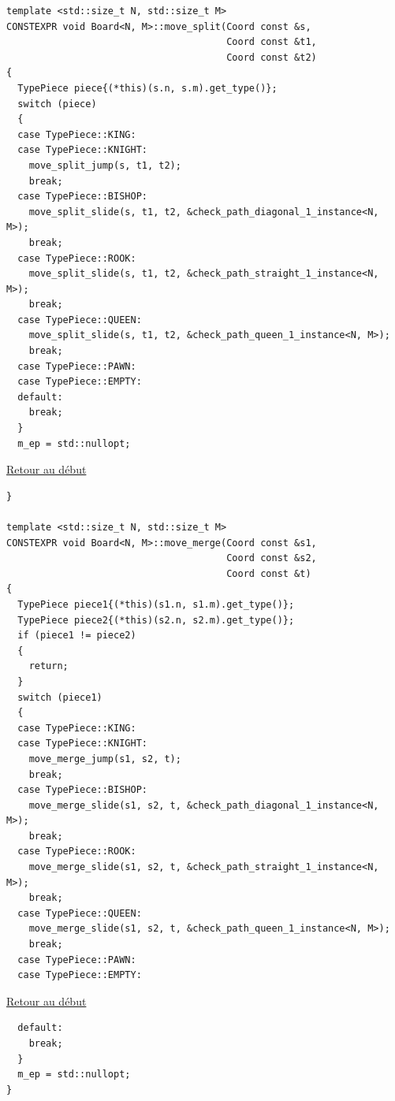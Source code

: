 {\begin{frame}[fragile]
\begin{verbatim}
template <std::size_t N, std::size_t M>
CONSTEXPR void Board<N, M>::move_split(Coord const &s,
                                       Coord const &t1,
                                       Coord const &t2)
{
  TypePiece piece{(*this)(s.n, s.m).get_type()};
  switch (piece)
  {
  case TypePiece::KING:
  case TypePiece::KNIGHT:
    move_split_jump(s, t1, t2);
    break;
  case TypePiece::BISHOP:
    move_split_slide(s, t1, t2, &check_path_diagonal_1_instance<N, M>);
    break;
  case TypePiece::ROOK:
    move_split_slide(s, t1, t2, &check_path_straight_1_instance<N, M>);
    break;
  case TypePiece::QUEEN:
    move_split_slide(s, t1, t2, &check_path_queen_1_instance<N, M>);
    break;
  case TypePiece::PAWN:
  case TypePiece::EMPTY:
  default:
    break;
  }
  m_ep = std::nullopt;
\end{verbatim}
\end{frame}

\begin{frame}[fragile]
\hyperlink{conclusion}{Retour au début}\newline
\begin{verbatim}
}

template <std::size_t N, std::size_t M>
CONSTEXPR void Board<N, M>::move_merge(Coord const &s1,
                                       Coord const &s2,
                                       Coord const &t)
{
  TypePiece piece1{(*this)(s1.n, s1.m).get_type()};
  TypePiece piece2{(*this)(s2.n, s2.m).get_type()};
  if (piece1 != piece2)
  {
    return;
  }
  switch (piece1)
  {
  case TypePiece::KING:
  case TypePiece::KNIGHT:
    move_merge_jump(s1, s2, t);
    break;
  case TypePiece::BISHOP:
    move_merge_slide(s1, s2, t, &check_path_diagonal_1_instance<N, M>);
    break;
  case TypePiece::ROOK:
    move_merge_slide(s1, s2, t, &check_path_straight_1_instance<N, M>);
    break;
  case TypePiece::QUEEN:
    move_merge_slide(s1, s2, t, &check_path_queen_1_instance<N, M>);
    break;
  case TypePiece::PAWN:
  case TypePiece::EMPTY:
\end{verbatim}
\end{frame}

\begin{frame}[fragile]
\hyperlink{conclusion}{Retour au début}\newline
\begin{verbatim}
  default:
    break;
  }
  m_ep = std::nullopt;
}


\end{verbatim}
\end{frame}}

